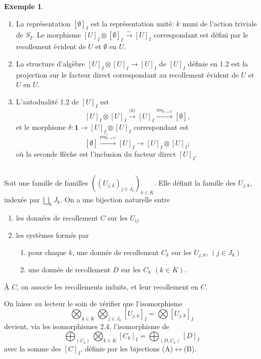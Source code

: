 \documentclass[11pt,a4paper]{article}
\theoremstyle{plain}
\theoremstyle{definition}
\newtheorem{example}[theorem]{Exemple}
\DeclareMathOperator{\res}{res}
\newcommand{\isom}{\xrightarrow{\sim}}
\begin{document}
\begin{example}
\begin{enumerate}[label=(\roman*)]
\item La repr\'esentation $[\emptyset]_I$ est la repr\'esentation unit\'e: $k$ muni de l'action triviale de $S_I$. Le morphisme $[U]_I \otimes [\emptyset]_I \isom [U]_I$ correspondant est d\'efini par le recollement \'evident de $U$ et $\emptyset$ en $U$.
\item La structure d'alg\`ebre $[U]_I \otimes [U]_I \to [U]_I$ de $[U]_I$ d\'efinie en 1.2 est la projection sur le facteur direct correspondant au recollement \'evident de $U$ et $U$ en $U$.
\item L'autodualit\'e 1.2 de $[U]_I$ est
\[
[U]_I \otimes [U]_I \xrightarrow{\text{(ii)}} [U]_I \xrightarrow{\res_{\emptyset \to U}} [\emptyset],
\]
et le morphisme $\delta : \mathbf{1} \to [U]_I \otimes [U]_I$ correspondant est
\[
[\emptyset] \xrightarrow{\res^*_{\emptyset \to U}} [U]_I \to [U]_I \otimes [U]_I;
\]
o\`u la seconde fl\`eche est l'inclusion du facteur direct $[U]_I$.
\end{enumerate}
\end{example}

\subsection{}
Soit une famille de familles $((U_{j,k})_{j \in J_k})_{k \in K}$. Elle d\'efinit la famille des $U_{j,k}$, index\'ee par $\bigsqcup_k J_k$. On a une bijection naturelle entre
\begin{enumerate}[label=(\Alph*)]
\item les donn\'ees de recollement $C$ sur les $U_{ij}$
\item les syst\`emes form\'es par
\begin{enumerate}
\item pour chaque $k$, une donn\'ee de recollement $C_k$ sur les $U_{j,k}$, $(j \in J_k)$
\item une donn\'ee de recollement $D$ sur les $C_k$ $(k \in K)$.
\end{enumerate}
\end{enumerate}
\`A $C$, on associe les recollements induits, et leur recollement en $C$.

On laisse au lecteur le soin de v\'erifier que l'isomorphisme
\[
\bigotimes_{k \in K} \bigotimes_{j \in J_k} [U_{j,k}]_I = \bigotimes [U_{j,k}]_I
\]
devient, via les isomorphismes 2.4, l'isomorphisme de
\[
\bigoplus_{(C_k)} \bigotimes_{k \in K} [C_k]_I = \bigoplus_{(D, C_k)} [D]_I
\]
avec la somme des $[C]_I$, d\'efinie par les bijections (A)$\leftrightarrow$(B).
\end{document}
